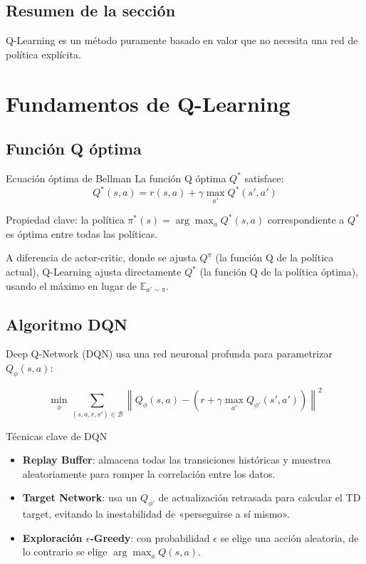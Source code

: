 \documentclass[a4paper]{article}
\begin{document}
\subsection{Resumen de la sección}

Q-Learning es un método puramente basado en valor que no necesita una red de política explícita.

\section{Fundamentos de Q-Learning}

\subsection{Función Q óptima}

\begin{importantbox}{Ecuación óptima de Bellman}
La función Q óptima $Q^*$ satisface:
$$Q^*(s, a) = r(s, a) + \gamma \max_{a'} Q^*(s', a')$$

Propiedad clave: la política $\pi^*(s) = \arg\max_a Q^*(s, a)$ correspondiente a $Q^*$ es óptima entre todas las políticas.
\end{importantbox}

A diferencia de actor-critic, donde se ajusta $Q^\pi$ (la función Q de la política actual), Q-Learning ajusta directamente $Q^*$ (la función Q de la política óptima), usando el máximo en lugar de $\mathbb{E}_{a' \sim \pi}$.

\subsection{Algoritmo DQN}

Deep Q-Network (DQN) usa una red neuronal profunda para parametrizar $Q_\phi(s, a)$:

$$\min_\phi \sum_{(s,a,r,s') \in \mathcal{B}} \left\| Q_\phi(s, a) - \left(r + \gamma \max_{a'} Q_{\phi'}(s', a')\right) \right\|^2$$

\begin{importantbox}{Técnicas clave de DQN}
\begin{itemize}
    \item \textbf{Replay Buffer}: almacena todas las transiciones históricas y muestrea aleatoriamente para romper la correlación entre los datos.
    \item \textbf{Target Network}: usa un $Q_{\phi'}$ de actualización retrasada para calcular el TD target, evitando la inestabilidad de «perseguirse a sí mismo».
    \item \textbf{Exploración $\epsilon$-Greedy}: con probabilidad $\epsilon$ se elige una acción aleatoria, de lo contrario se elige $\arg\max_a Q(s,a)$.
\end{itemize}
\end{importantbox}
\end{document}
